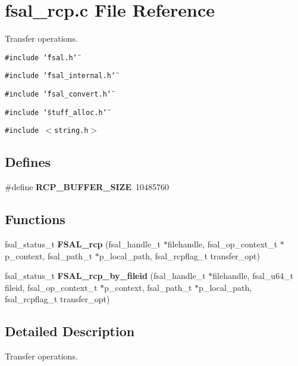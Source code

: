 \section{fsal\_\-rcp.c File Reference}
\label{fsal__rcp_8c}
Transfer operations.  


{\tt \#include \char`\"{}fsal.h\char`\"{}}\par
{\tt \#include \char`\"{}fsal\_\-internal.h\char`\"{}}\par
{\tt \#include \char`\"{}fsal\_\-convert.h\char`\"{}}\par
{\tt \#include \char`\"{}stuff\_\-alloc.h\char`\"{}}\par
{\tt \#include $<$string.h$>$}\par
\subsection*{Defines}
\begin{CompactItemize}
\item 
\#define \textbf{RCP\_\-BUFFER\_\-SIZE}~10485760\label{fsal__rcp_8c_a89c28e4de124af032c98de9f22616fe}

\end{CompactItemize}
\subsection*{Functions}
\begin{CompactItemize}
\item 
fsal\_\-status\_\-t {\bf FSAL\_\-rcp} (fsal\_\-handle\_\-t $\ast$filehandle, fsal\_\-op\_\-context\_\-t $\ast$p\_\-context, fsal\_\-path\_\-t $\ast$p\_\-local\_\-path, fsal\_\-rcpflag\_\-t transfer\_\-opt)
\item 
fsal\_\-status\_\-t \textbf{FSAL\_\-rcp\_\-by\_\-fileid} (fsal\_\-handle\_\-t $\ast$filehandle, fsal\_\-u64\_\-t fileid, fsal\_\-op\_\-context\_\-t $\ast$p\_\-context, fsal\_\-path\_\-t $\ast$p\_\-local\_\-path, fsal\_\-rcpflag\_\-t transfer\_\-opt)\label{fsal__rcp_8c_ac719f82cfdb21bc35fc2178332c202c}

\end{CompactItemize}


\subsection{Detailed Description}
Transfer operations. 

